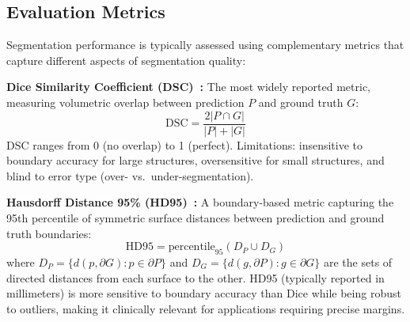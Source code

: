\begin{table}[!htb]
\centering
\small
\caption{Preprocessing Configurations of Leading Segmentation Methods. Entries reflect the configuration described in the cited publication or its version documentation where available, and should be verified against the specific version and task deployed, as configurations vary across releases; for TotalSegmentator~\cite{wasserthal2023totalsegmentator}, the entry summarizes commonly reported toolchain practice rather than preprocessing documented in the cited publication. Verified method-level facts for the cited version are recorded in Supplementary Data~S8.}
\label{tab:preprocessing}
\end{table}

\subsection{Evaluation Metrics}

Segmentation performance is typically assessed using complementary metrics that capture different aspects of segmentation quality:

\textbf{Dice Similarity Coefficient (DSC)~\cite{dice1945measures}:} The most widely reported metric, measuring volumetric overlap between prediction $P$ and ground truth $G$:
\begin{equation}
\text{DSC} = \frac{2|P \cap G|}{|P| + |G|}
\end{equation}
DSC ranges from 0 (no overlap) to 1 (perfect). Limitations: insensitive to boundary accuracy for large structures, oversensitive for small structures, and blind to error type (over- vs.\ under-segmentation).

\textbf{Hausdorff Distance 95\% (HD95)~\cite{huttenlocher1993comparing}:} A boundary-based metric capturing the 95th percentile of symmetric surface distances between prediction and ground truth boundaries:
\begin{equation}
\text{HD95} = \text{percentile}_{95}(D_P \cup D_G)
\end{equation}
where $D_P = \{d(p, \partial G) : p \in \partial P\}$ and $D_G = \{d(g, \partial P) : g \in \partial G\}$ are the sets of directed distances from each surface to the other. HD95 (typically reported in millimeters) is more sensitive to boundary accuracy than Dice while being robust to outliers, making it clinically relevant for applications requiring precise margins.

